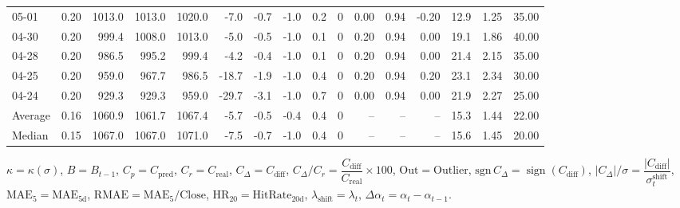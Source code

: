 \begin{threeparttable}
{\begin{tabular}{lrrrrrrrrrrrrrrr}
  05-01 &     0.20 & 1013.0 & 1013.0 & 1020.0 &       -7.0 &           -0.7 &                     -1.0 &                 0.2 &              0 &       0.00 &      0.94 &          -0.20 &             12.9 &            1.25 &                  35.00 \\
  04-30 &     0.20 &  999.4 & 1008.0 & 1013.0 &       -5.0 &           -0.5 &                     -1.0 &                 0.1 &              0 &       0.20 &      0.94 &           0.00 &             19.1 &            1.86 &                  40.00 \\
  04-28 &     0.20 &  986.5 &  995.2 &  999.4 &       -4.2 &           -0.4 &                     -1.0 &                 0.1 &              0 &       0.20 &      0.94 &           0.00 &             21.4 &            2.15 &                  35.00 \\
  04-25 &     0.20 &  959.0 &  967.7 &  986.5 &      -18.7 &           -1.9 &                     -1.0 &                 0.4 &              0 &       0.20 &      0.94 &           0.20 &             23.1 &            2.34 &                  30.00 \\
  04-24 &     0.20 &  929.3 &  929.3 &  959.0 &      -29.7 &           -3.1 &                     -1.0 &                 0.7 &              0 &       0.00 &      0.94 &           0.00 &             21.9 &            2.27 &                  25.00 \\
Average &     0.16 & 1060.9 & 1061.7 & 1067.4 &       -5.7 &           -0.5 &                     -0.4 &                 0.4 &              0 &         -- &        -- &             -- &             15.3 &            1.44 &                  22.00 \\
 Median &     0.15 & 1067.0 & 1067.0 & 1071.0 &       -7.5 &           -0.7 &                     -1.0 &                 0.4 &              0 &         -- &        -- &             -- &             15.6 &            1.45 &                  20.00 \\
\bottomrule
\end{tabular}
}
\begin{tablenotes}\footnotesize
\item $\kappa=\kappa(\sigma)$, $B=B_{t-1}$, $C_p=C_{\text{pred}}$, $C_r=C_{\text{real}}$, $C_\Delta=C_{\text{diff}}$, $C_\Delta/C_r=\dfrac{C_{\text{diff}}}{C_{\text{real}}}\times100$, $\mathrm{Out}=\text{Outlier}$, $\mathrm{sgn}\,C_\Delta=\operatorname{sign}(C_{\text{diff}})$, $|C_\Delta|/\sigma=\dfrac{|C_{\text{diff}}|}{\sigma_t^{\text{shift}}}$, $\mathrm{MAE}_5=\mathrm{MAE}_{5\text{d}}$, $\mathrm{RMAE}= \mathrm{MAE}_5 / \text{Close}$, $\mathrm{HR}_{20}=\mathrm{HitRate}_{20\text{d}}$, 
$\lambda_{\text{shift}}=\lambda_t$, 
$\Delta\alpha_t=\alpha_t-\alpha_{t-1}$.
\end{tablenotes}
\end{threeparttable}
\endgroup

